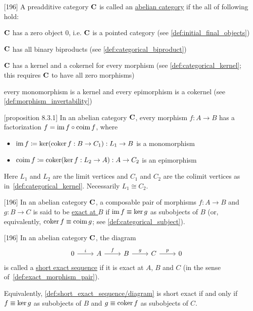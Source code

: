 \begin{definition}\label{def:abelian_category}\cite{MacLane1994}[196]
  A preadditive category $\operatorname{\mathbf{C}}$ is called an \uline{abelian category} if the all of following hold:
  \begin{defenum}
    \item $\operatorname{\mathbf{C}}$ has a zero object $0$, i.e. $\operatorname{\mathbf{C}}$ is a pointed category (see \cref{def:initial_final_objects})
    \item $\operatorname{\mathbf{C}}$ has all binary biproducts (see \cref{def:categorical_biproduct})
    \item $\operatorname{\mathbf{C}}$ has a kernel and a cokernel for every morphism (see \cref{def:categorical_kernel}; this requires $\operatorname{\mathbf{C}}$ to have all zero morphisms)
    \item every monomorphism is a kernel and every epimorphism is a cokernel (see \cref{def:morphism_invertability})
  \end{defenum}
\end{definition}

\begin{proposition}\label{def:abelian_category_morphism_factorization}\cite{MacLane1994}[proposition 8.3.1]
  In an abelian category $\operatorname{\mathbf{C}}$, every morphism $f: A \to B$ has a factorization $f = \operatorname{im} f \circ \operatorname{coim} f$, where
  \begin{itemize}
    \item $\operatorname{im} f \coloneqq \operatorname{ker}(\operatorname{coker} f: B \to C_1): L_1 \to B$ is a monomorphism
    \item $\operatorname{coim} f \coloneqq \operatorname{coker}(\operatorname{ker} f: L_2 \to A): A \to C_2$ is an epimorphism
  \end{itemize}
  Here $L_1$ and $L_2$ are the limit vertices and $C_1$ and $C_2$ are the colimit vertices as in~\cref{def:categorical_kernel}. Necessarily $L_1 \cong C_2$.
\end{proposition}

\begin{definition}\label{def:exact_morphism_pair}\cite{MacLane1994}[196]
  In an abelian category $\operatorname{\mathbf{C}}$, a composable pair of morphisms $f: A \to B$ and $g: B \to C$ is said to be \uline{exact at $B$} if $\operatorname{im} f \equiv \operatorname{ker} g$ as subobjects of $B$ (or, equivalently, $\operatorname{coker} f \equiv \operatorname{coim} g$; see \cref{def:categorical_subject}).
\end{definition}

\begin{definition}\label{def:short_exact_sequence}\cite{MacLane1994}[196]
  In an abelian category $\operatorname{\mathbf{C}}$, the diagram
  \begin{equation}\label{def:short_exact_sequence/diagram}
    \begin{tikzcd}[baseline=(current bounding box.center)]
      0 \arrow[r, "i"] & A \arrow[r, "f"] & B \arrow[r, "g"] & C \arrow[r, "p"] & 0
    \end{tikzcd}
  \end{equation}
  is called a \uline{short exact sequence} if it is exact at $A$, $B$ and $C$ (in the sense of~\cref{def:exact_morphism_pair}).

  Equivalently, \cref{def:short_exact_sequence/diagram} is short exact if and only if $f \equiv \operatorname{ker} g$ as subobjects of $B$ and $g \equiv \operatorname{coker} f$ as subobjects of $C$.
\end{definition}
